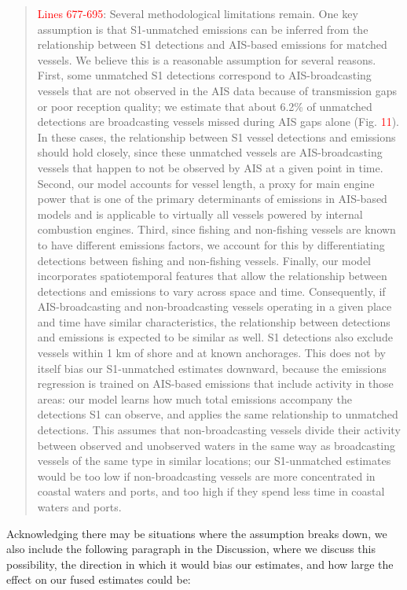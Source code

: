 \documentclass[11pt]{article}
\begin{document}
\begin{quote}
\textcolor{red}{Lines 677-695}: Several methodological limitations remain. One key assumption is that S1-unmatched emissions can be inferred from the relationship between S1 detections and AIS-based emissions for matched vessels. We believe this is a reasonable assumption for several reasons. First, some unmatched S1 detections correspond to AIS-broadcasting vessels that are not observed in the AIS data because of transmission gaps or poor reception quality; we estimate that about 6.2\% of unmatched detections are broadcasting vessels missed during AIS gaps alone (Fig. \textcolor{red}{11}). In these cases, the relationship between S1 vessel detections and emissions should hold closely, since these unmatched vessels are AIS-broadcasting vessels that happen to not be observed by AIS at a given point in time. Second, our model accounts for vessel length, a proxy for main engine power that is one of the primary determinants of emissions in AIS-based models and is applicable to virtually all vessels powered by internal combustion engines. Third, since fishing and non-fishing vessels are known to have different emissions factors, we account for this by differentiating detections between fishing and non-fishing vessels. Finally, our model incorporates spatiotemporal features that allow the relationship between detections and emissions to vary across space and time. Consequently, if AIS-broadcasting and non-broadcasting vessels operating in a given place and time have similar characteristics, the relationship between detections and emissions is expected to be similar as well. S1 detections also exclude vessels within 1 km of shore and at known anchorages. This does not by itself bias our S1-unmatched estimates downward, because the emissions regression is trained on AIS-based emissions that include activity in those areas: our model learns how much total emissions accompany the detections S1 can observe, and applies the same relationship to unmatched detections. This assumes that non-broadcasting vessels divide their activity between observed and unobserved waters in the same way as broadcasting vessels of the same type in similar locations; our S1-unmatched estimates would be too low if non-broadcasting vessels are more concentrated in coastal waters and ports, and too high if they spend less time in coastal waters and ports.
\end{quote}

Acknowledging there may be situations where the assumption breaks down, we also include the following paragraph in the Discussion, where we discuss this possibility, the direction in which it would bias our estimates, and how large the effect on our fused estimates could be:
\end{document}
